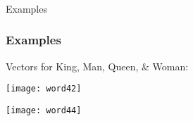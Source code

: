 



\begin{frame}[fragile]\frametitle{}

\begin{center}
{\Large Examples}
\end{center}
\end{frame}




\begin{frame}[fragile]\frametitle{Examples}
Vectors for King, Man, Queen, \& Woman:
\begin{center}
\texttt{[image: word42]}
\end{center}


\begin{center}
\texttt{[image: word44]}
\end{center}

\end{frame}

